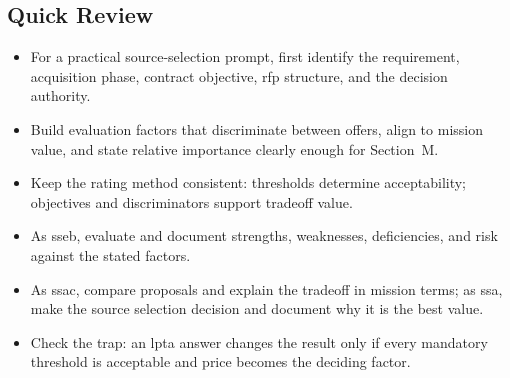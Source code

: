 \documentclass[../main.tex]{subfiles}
\begin{document}
\subsection{Quick Review}
\begin{itemize}
  \item For a practical source-selection prompt, first identify the requirement, acquisition phase, contract objective, \ac{rfp} structure, and the decision authority.
  \item Build evaluation factors that discriminate between offers, align to mission value, and state relative importance clearly enough for Section~M.
  \item Keep the rating method consistent: thresholds determine acceptability; objectives and discriminators support tradeoff value.
  \item As \ac{sseb}, evaluate and document strengths, weaknesses, deficiencies, and risk against the stated factors.
  \item As \ac{ssac}, compare proposals and explain the tradeoff in mission terms; as \ac{ssa}, make the source selection decision and document why it is the best value.
  \item Check the trap: an \ac{lpta} answer changes the result only if every mandatory threshold is acceptable and price becomes the deciding factor.
\end{itemize}

\end{document}
